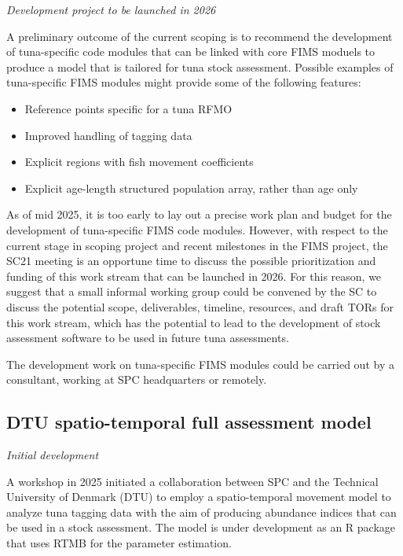 \documentclass{SCreport}
\begin{document}
\textit{Development project to be launched in 2026}

A preliminary outcome of the current scoping is to recommend the development of
tuna-specific code modules that can be linked with core FIMS moduels to produce
a model that is tailored for tuna stock assessment. Possible examples of
tuna-specific FIMS modules might provide some of the following features:

\begin{itemize}
  \item Reference points specific for a tuna RFMO\\[-4.5ex]
  \item Improved handling of tagging data\\[-4.5ex]
  \item Explicit regions with fish movement coefficients\\[-4.5ex]
  \item Explicit age-length structured population array, rather than age only
\end{itemize}

As of mid 2025, it is too early to lay out a precise work plan and budget for
the development of tuna-specific FIMS code modules. However, with respect to the
current stage in scoping project and recent milestones in the FIMS project, the
SC21 meeting is an opportune time to discuss the possible prioritization and
funding of this work stream that can be launched in 2026. For this reason, we
suggest that a small informal working group could be convened by the SC to
discuss the potential scope, deliverables, timeline, resources, and draft TORs
for this work stream, which has the potential to lead to the development of
stock assessment software to be used in future tuna assessments.

The development work on tuna-specific FIMS modules could be carried out by a
consultant, working at SPC headquarters or remotely.

\subsection{DTU spatio-temporal full assessment model}

\textit{Initial development}

A workshop in 2025 initiated a collaboration between SPC and the Technical
University of Denmark (DTU) to employ a spatio-temporal movement model to
analyze tuna tagging data with the aim of producing abundance indices that can
be used in a stock assessment. The model is under development as an R package
that uses RTMB for the parameter estimation.
\end{document}
